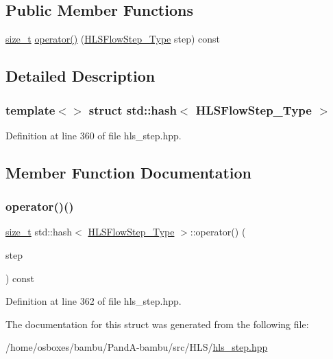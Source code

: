 \subsection*{Public Member Functions}
\begin{DoxyCompactItemize}
\item 
\hyperlink{tutorial__fpt__2017_2intro_2sixth_2test_8c_a7c94ea6f8948649f8d181ae55911eeaf}{size\+\_\+t} \hyperlink{structstd_1_1hash_3_01HLSFlowStep__Type_01_4_af327e182c4407ded4772e4d9df65897c}{operator()} (\hyperlink{hls__step_8hpp_ada16bc22905016180e26fc7e39537f8d}{H\+L\+S\+Flow\+Step\+\_\+\+Type} step) const
\end{DoxyCompactItemize}


\subsection{Detailed Description}
\subsubsection*{template$<$$>$\newline
struct std\+::hash$<$ H\+L\+S\+Flow\+Step\+\_\+\+Type $>$}



Definition at line 360 of file hls\+\_\+step.\+hpp.



\subsection{Member Function Documentation}
\mbox{\label{structstd_1_1hash_3_01HLSFlowStep__Type_01_4_af327e182c4407ded4772e4d9df65897c}} 
\subsubsection{\texorpdfstring{operator()()}{operator()()}}
{\footnotesize\ttfamily \hyperlink{tutorial__fpt__2017_2intro_2sixth_2test_8c_a7c94ea6f8948649f8d181ae55911eeaf}{size\+\_\+t} std\+::hash$<$ \hyperlink{hls__step_8hpp_ada16bc22905016180e26fc7e39537f8d}{H\+L\+S\+Flow\+Step\+\_\+\+Type} $>$\+::operator() (\begin{DoxyParamCaption}\item[{\hyperlink{hls__step_8hpp_ada16bc22905016180e26fc7e39537f8d}{H\+L\+S\+Flow\+Step\+\_\+\+Type}}]{step }\end{DoxyParamCaption}) const\hspace{0.3cm}{\ttfamily [inline]}}



Definition at line 362 of file hls\+\_\+step.\+hpp.



The documentation for this struct was generated from the following file\+:\begin{DoxyCompactItemize}
\item 
/home/osboxes/bambu/\+Pand\+A-\/bambu/src/\+H\+L\+S/\hyperlink{hls__step_8hpp}{hls\+\_\+step.\+hpp}\end{DoxyCompactItemize}
